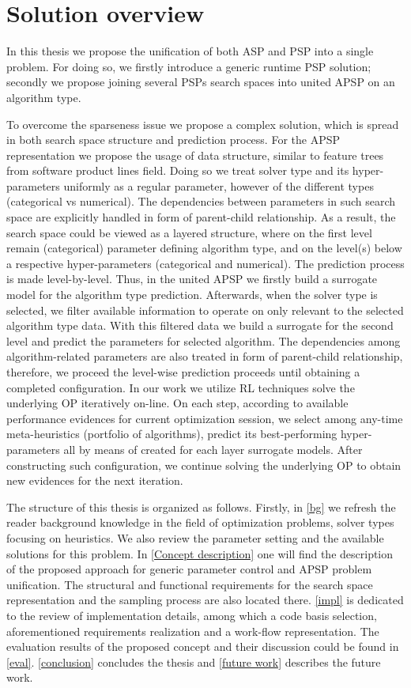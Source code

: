 \section{Solution overview}
In this thesis we propose the unification of both ASP and PSP into a single problem. For doing so, we firstly introduce a generic runtime PSP solution; secondly we propose joining several PSPs search spaces into united APSP on an algorithm type.

To overcome the sparseness issue we propose a complex solution, which is spread in both search space structure and prediction process. For the APSP representation we propose the usage of data structure, similar to feature trees from software product lines field. Doing so we treat solver type and its hyper-parameters uniformly as a regular parameter, however of the different types (categorical vs numerical). The dependencies between parameters in such search space are explicitly handled in form of parent-child relationship. As a result, the search space could be viewed as a layered structure, where on the first level remain (categorical) parameter defining algorithm type, and on the level(s) below a respective hyper-parameters (categorical and numerical). The prediction process is made level-by-level. Thus, in the united APSP we firstly build a surrogate model for the algorithm type prediction. Afterwards, when the solver type is selected, we filter available information to operate on only relevant to the selected algorithm type data. With this filtered data we build a surrogate for the second level and predict the parameters for selected algorithm. The dependencies among algorithm-related parameters are also treated in form of parent-child relationship, therefore, we proceed the level-wise prediction proceeds until obtaining a completed configuration. In our work we utilize RL techniques solve the underlying OP iteratively on-line. On each step, according to available performance evidences for current optimization session, we select among any-time meta-heuristics (portfolio of algorithms), predict its best-performing hyper-parameters all by means of created for each layer surrogate models. After constructing such configuration, we continue solving the underlying OP to obtain new evidences for the next iteration.

The structure of this thesis is organized as follows. Firstly, in \cref{bg} we refresh the reader background knowledge in the field of optimization problems, solver types focusing on heuristics. We also review the parameter setting and the available solutions for this problem. In \cref{Concept description} one will find the description of the proposed approach for generic parameter control and APSP problem unification. The structural and functional requirements for the search space representation and the sampling process are also located there. \cref{impl} is dedicated to the review of implementation details, among which a code basis selection, aforementioned requirements realization and a work-flow representation. The evaluation results of the proposed concept and their discussion could be found in \cref{eval}. \cref{conclusion} concludes the thesis and \cref{future work} describes the future work.
